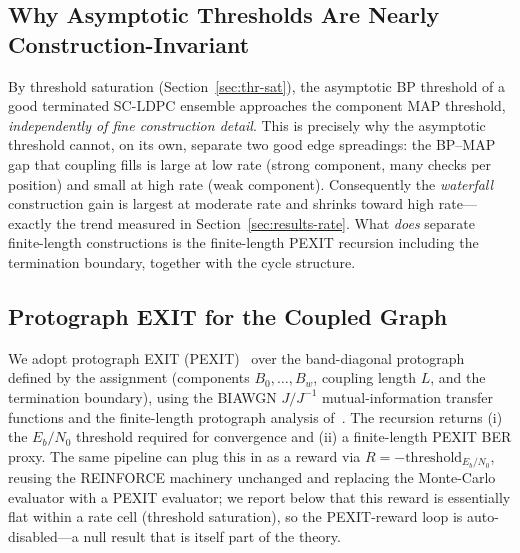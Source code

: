 \documentclass[journal]{IEEEtran}
\begin{document}
\subsection{Why Asymptotic Thresholds Are Nearly Construction-Invariant}
By threshold saturation (Section~\ref{sec:thr-sat}), the asymptotic BP threshold
of a good terminated SC-LDPC ensemble approaches the component MAP threshold,
\emph{independently of fine construction detail}. This is precisely why the
asymptotic threshold cannot, on its own, separate two good edge spreadings: the
BP--MAP gap that coupling fills is large at low rate (strong component, many
checks per position) and small at high rate (weak component). Consequently the
\emph{waterfall} construction gain is largest at moderate rate and shrinks toward
high rate---exactly the trend measured in Section~\ref{sec:results-rate}. What
\emph{does} separate finite-length constructions is the finite-length PEXIT
recursion including the termination boundary, together with the cycle structure.

\subsection{Protograph EXIT for the Coupled Graph}
We adopt protograph EXIT (PEXIT)~\cite{liva2007pexit} over the band-diagonal
protograph defined by the assignment (components $B_0,\dots,B_w$, coupling length
$L$, and the termination boundary), using the BIAWGN $J/J^{-1}$ mutual-information
transfer functions and the finite-length protograph analysis
of~\cite{stinner2014finitelength}. The recursion returns (i) the $E_b/N_0$
threshold required for convergence and (ii) a finite-length PEXIT BER proxy.
The same pipeline can plug this in as a reward via
$R = -\text{threshold}_{E_b/N_0}$, reusing the REINFORCE machinery unchanged
and replacing the Monte-Carlo evaluator with a PEXIT evaluator; we report below
that this reward is essentially flat within a rate cell (threshold saturation),
so the PEXIT-reward loop is auto-disabled---a null result that is itself part
of the theory.
\end{document}
